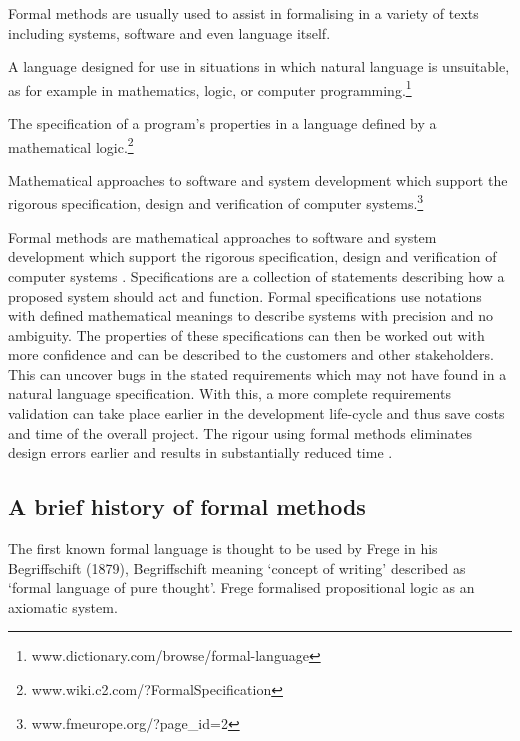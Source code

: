 Formal methods are usually used to assist in formalising in a variety of texts
including systems, software and even language itself.

\begin{defin} A language designed for use in situations in
which natural language is unsuitable, as for example in mathematics, logic, or
computer programming.\footnote{www.dictionary.com/browse/formal-language}
\end{defin}

\begin{defin} The specification of a program's properties
in a language defined by a mathematical
logic.\footnote{www.wiki.c2.com/?FormalSpecification}
\end{defin}

\begin{defin} Mathematical approaches to software and system
development which support the rigorous specification, design and verification of
computer systems.\footnote{www.fmeurope.org/?page\_id=2}
\end{defin}

Formal methods are mathematical approaches to software and system development
which support the rigorous specification, design and verification of computer
systems \cite{fmeurope}. Specifications are a collection of statements
describing how a proposed system should act and function. Formal specifications
use notations with defined mathematical meanings to describe systems with
precision and no ambiguity. The properties of these specifications can then be
worked out with more confidence and can be described to the customers and other
stakeholders. This can uncover bugs in the stated requirements which may not
have found in a natural language specification. With this, a more complete
requirements validation can take place earlier in the development life-cycle and
thus save costs and time of the overall project. The rigour using formal methods
eliminates design errors earlier and results in substantially reduced time
\cite{benefitsofform}. 

\subsection{A brief history of formal methods}

The first known formal language is thought to be used by Frege in his
Begriffschift (1879), Begriffschift meaning `concept of writing' described as
`formal language of pure thought'. Frege formalised propositional logic as an
axiomatic system.


